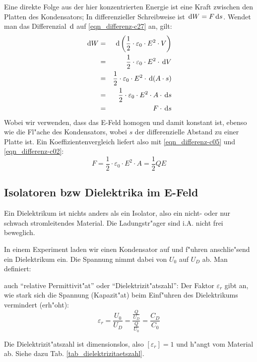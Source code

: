 Eine direkte Folge aus der hier konzentrierten Energie ist eine Kraft
zwischen den Platten des Kondensators; In differenzieller Schreibweise
ist $\, \mathrm{d} W = F \, \mathrm{d} s$. Wendet man das Differenzial $\, \mathrm{d}$ auf
\eqref{eqn_differenz-c27} an, gilt:
\begin{eqnarray*}
   \label{eqn_differenz-c26}
   \, \mathrm{d} W &=& \, \mathrm{d} \left ( \frac{1}{2} \cdot \varepsilon_0 \cdot E^2
      \cdot V \right )\\
&=& \frac{1}{2} \cdot \varepsilon_0 \cdot E^2 \cdot \, \mathrm{d} V\\
&=& \frac{1}{2} \cdot \varepsilon_0 \cdot E^2 \cdot \, \mathrm{d} (A \cdot s)\\
&=& \frac{1}{2} \cdot \varepsilon_0 \cdot E^2 \cdot A \cdot \, \mathrm{d} s\\
&=& F \cdot \, \mathrm{d} s
\end{eqnarray*}
Wobei wir verwenden, dass das E-Feld homogen und damit konstant ist,
ebenso wie die Fl"ache des Kondensators, wobei $s$ der differenzielle
Abstand zu einer Platte ist. Ein Koeffizientenvergleich liefert also
mit \eqref{eqn_differenz-c05} und \eqref{eqn_differenz-c02}:
\begin{equation}
   \label{eqn_differenz-c28}
   F = \frac{1}{2} \cdot \varepsilon_0 \cdot E^2 \cdot A = \frac{1}{2}
   Q E
\end{equation}




\subsection{Isolatoren bzw Dielektrika im E-Feld}
\label{kap_isolatoren-im-e-feld}


\begin{Def}
    Ein Dielektrikum ist nichts
   anders als ein Isolator, also ein nicht- oder nur schwach
   stromleitendes Material. Die Ladungstr"ager sind i.A. nicht frei
   beweglich.
\end{Def}

In einem Experiment laden wir einen Kondensator auf und f"uhren
anschlie"send ein Dielektrikum ein. Die Spannung nimmt dabei von $U_0$
auf $U_D$ ab. Man definiert:
\begin{Def}
    auch "`relative Permittivit"at"' oder "`Dielektrizit"atszahl"':
   Der Faktor $\varepsilon_r$ gibt an, wie stark sich die Spannung
   (Kapazit"at) beim Einf"uhren des Dielektrikums vermindert
   (erh"oht):
   \begin{equation}
      \label{eqn_def_espilon}
       \varepsilon_r = \frac{U_0}{U_D} =
      \frac{\frac{Q}{U_D}}{\frac{Q}{U_0}} = \frac{C_D}{C_0}
   \end{equation}
\end{Def}
Die Dielektrizit"atszahl ist dimensionslos, also $[\varepsilon_r] = 1$
und h"angt vom Material ab. Siehe dazu
Tab. \ref{tab_dielektrizitaetszahl}.


